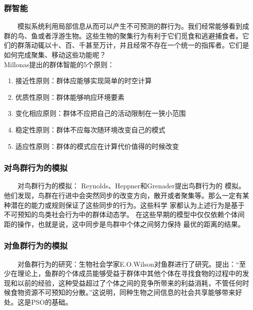 \begin{frame}
  \frametitle{群智能}
  $\qquad$模拟系统利用局部信息从而可以产生不可预测的群行为。我们经常能够看到成群的鸟、鱼或者浮游生物。这些生物的聚集行为有利于它们觅食和逃避捕食者。它们的群落动辄以十、百、千甚至万计，并且经常不存在一个统一的指挥者。它们是如何完成聚集、移动这些功能呢？
  \\
  Millonas提出的群体智能的5个原则：
   \begin{enumerate}
      \item{接近性原则：群体应能够实现简单的时空计算}
      \item{优质性原则：群体能够响应环境要素}
      \item{变化相应原则：群体不应把自己的活动限制在一狭小范围}
      \item{稳定性原则：群体不应每次随环境改变自己的模式}
      \item{适应性原则：群体的模式应在计算代价值得的时候改变}
    \end{enumerate}
\end{frame}

\begin{frame}
  \frametitle{对鸟群行为的模拟}
  $\qquad$对鸟群行为的模拟： Reynolds、Heppner和Grenader提出鸟群行为的 模拟。他们发现，鸟群在行进中会突然同步的改变方向，散开或者聚集等。那么一定有某种潜在的能力或规则保证了这些同步的行为。这些科学 家都认为上述行为是基于不可预知的鸟类社会行为中的群体动态学。 在这些早期的模型中仅仅依赖个体间距的操作，也就是说，这中同步是鸟群中个体之间努力保持 最优的距离的结果。
\end{frame}

\begin{frame}
  \frametitle{对鱼群行为的模拟}
  $\qquad$对鱼群行为的研究：生物社会学家E.O.Wilson对鱼群进行了研究。提出：“至少在理论上，鱼群的个体成员能够受益于群体中其他个体在寻找食物的过程中的发现和以前的经验，这种受益超过了个体之间的竞争所带来的利益消耗，不管任何时候食物资源不可预知的分散。”这说明，同种生物之间信息的社会共享能够带来好处。这是PSO的基础。　
\end{frame}